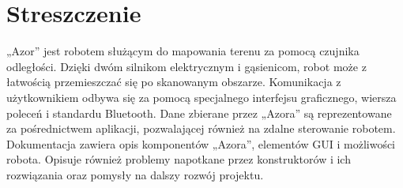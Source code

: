 \section*{Streszczenie}
    \tab „Azor” jest robotem służącym do mapowania terenu za pomocą czujnika odległości. 
    Dzięki dwóm silnikom elektrycznym i gąsienicom, robot może z łatwością przemieszczać się po skanowanym obszarze. 
    Komunikacja z użytkownikiem odbywa się za pomocą specjalnego interfejsu graficznego, wiersza poleceń i standardu Bluetooth.
    Dane zbierane przez „Azora” są reprezentowane za pośrednictwem aplikacji, pozwalającej również na zdalne sterowanie robotem.
    Dokumentacja zawiera opis komponentów „Azora”, elementów GUI i możliwości robota.
    Opisuje również problemy napotkane przez konstruktorów i ich rozwiązania oraz pomysły na dalszy rozwój projektu.
